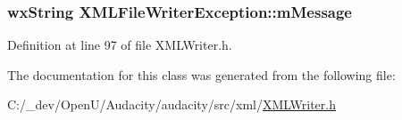 \subsubsection[{\texorpdfstring{m\+Message}{mMessage}}]{\setlength{\rightskip}{0pt plus 5cm}wx\+String X\+M\+L\+File\+Writer\+Exception\+::m\+Message\hspace{0.3cm}{\ttfamily [protected]}}\hypertarget{class_x_m_l_file_writer_exception_a2234a7f472811e9cd5000dbd46d3af80}{}\label{class_x_m_l_file_writer_exception_a2234a7f472811e9cd5000dbd46d3af80}


Definition at line 97 of file X\+M\+L\+Writer.\+h.



The documentation for this class was generated from the following file\+:\begin{DoxyCompactItemize}
\item 
C\+:/\+\_\+dev/\+Open\+U/\+Audacity/audacity/src/xml/\hyperlink{_x_m_l_writer_8h}{X\+M\+L\+Writer.\+h}\end{DoxyCompactItemize}
